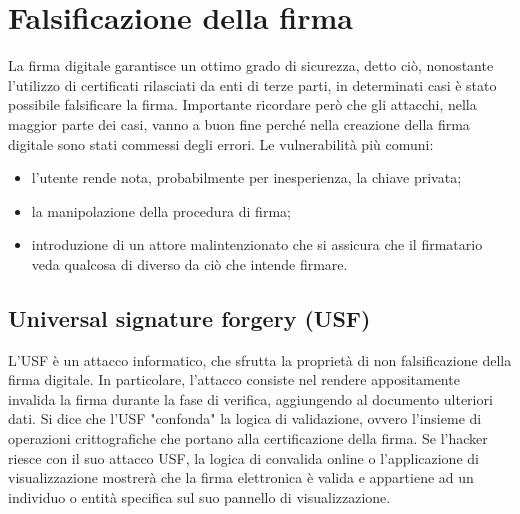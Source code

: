 \chapter{Falsificazione della firma}

La firma digitale garantisce un ottimo grado di sicurezza, detto ciò, nonostante l'utilizzo di certificati rilasciati da enti di terze parti, in determinati casi è stato possibile falsificare la firma.
Importante ricordare però che gli attacchi, nella maggior parte dei casi, vanno a buon fine perché nella creazione della firma digitale sono stati commessi degli errori. Le vulnerabilità più comuni:
\begin{itemize}
	\item l'utente rende nota, probabilmente per inesperienza, la chiave privata;
	\item la manipolazione della procedura di firma;
	\item introduzione di un attore malintenzionato che si assicura che il firmatario veda qualcosa di diverso da ciò che intende firmare.
\end{itemize}

\section{Universal signature forgery (USF)}

L'USF è un attacco informatico, che sfrutta la proprietà di non falsificazione della firma digitale. In particolare, l'attacco consiste nel rendere appositamente invalida la firma durante la fase di verifica, aggiungendo al documento ulteriori dati. Si dice che l'USF "confonda" la logica di validazione, ovvero l'insieme di operazioni crittografiche che portano alla certificazione della firma. 
Se l'hacker riesce con il suo attacco USF, la logica di convalida online o l'applicazione di visualizzazione mostrerà che la firma elettronica è valida e appartiene ad un individuo o entità specifica sul suo pannello di visualizzazione. 

